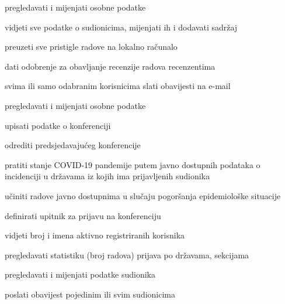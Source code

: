 \begin{packed_enum}
\begin{packed_enum}
\begin{packed_enum}
					
					\end{packed_enum}
				
					\item  {}
				
					\begin{packed_enum}
						
						\item pregledavati i mijenjati osobne podatke 
						\item vidjeti sve podatke o sudionicima, mijenjati ih i dodavati sadržaj
						\item preuzeti sve pristigle radove na lokalno računalo
						\item dati odobrenje za obavljanje recenzije radova recenzentima
						\item svima ili samo odabranim korisnicima slati obavijesti na e-mail
					
				
					\end{packed_enum}
				
					\item  {}
				
					\begin{packed_enum}
						
						\item pregledavati i mijenjati osobne podatke 
						\item upisati podatke o konferenciji
						\item odrediti predsjedavajućeg konferencije
						\item pratiti stanje COVID-19 pandemije putem javno dostupnih podataka o incidenciji u državama iz kojih ima prijavljenih sudionika
						\item učiniti radove javno dostupnima u slučaju pogoršanja epidemiološke situacije
						\item definirati upitnik za prijavu na konferenciju
						\item vidjeti broj i imena aktivno registriranih korisnika
						\item pregledavati statistiku (broj radova) prijava po državama, sekcijama
						\item pregledavati i mijenjati podatke sudionika
						\item poslati obavijest pojedinim ili svim sudionicima 

					\end{packed_enum}
				\end{packed_enum}



\end{packed_enum}
